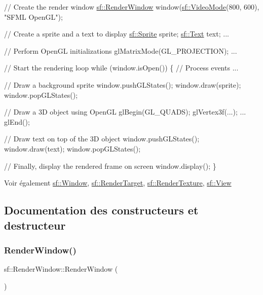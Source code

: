 \begin{DoxyCode}
\textcolor{comment}{// Create the render window}
\hyperlink{classsf_1_1RenderWindow}{sf::RenderWindow} window(\hyperlink{classsf_1_1VideoMode}{sf::VideoMode}(800, 600), \textcolor{stringliteral}{"SFML OpenGL"});

\textcolor{comment}{// Create a sprite and a text to display}
\hyperlink{classsf_1_1Sprite}{sf::Sprite} sprite;
\hyperlink{classsf_1_1Text}{sf::Text} text;
...

\textcolor{comment}{// Perform OpenGL initializations}
glMatrixMode(GL\_PROJECTION);
...

\textcolor{comment}{// Start the rendering loop}
while (window.isOpen())
\{
    \textcolor{comment}{// Process events}
    ...

    \textcolor{comment}{// Draw a background sprite}
    window.pushGLStates();
    window.draw(sprite);
    window.popGLStates();

    \textcolor{comment}{// Draw a 3D object using OpenGL}
    glBegin(GL\_QUADS);
        glVertex3f(...);
        ...
    glEnd();

    \textcolor{comment}{// Draw text on top of the 3D object}
    window.pushGLStates();
    window.draw(text);
    window.popGLStates();

    \textcolor{comment}{// Finally, display the rendered frame on screen}
    window.display();
\}
\end{DoxyCode}


\begin{DoxySeeAlso}{Voir également}
\hyperlink{classsf_1_1Window}{sf\+::\+Window}, \hyperlink{classsf_1_1RenderTarget}{sf\+::\+Render\+Target}, \hyperlink{classsf_1_1RenderTexture}{sf\+::\+Render\+Texture}, \hyperlink{classsf_1_1View}{sf\+::\+View} 
\end{DoxySeeAlso}


\subsection{Documentation des constructeurs et destructeur}
\mbox{\label{classsf_1_1RenderWindow_a839bbf336bdcafb084dafc3076fc9021}} 
\subsubsection{\texorpdfstring{Render\+Window()}{RenderWindow()}\hspace{0.1cm}{\footnotesize\ttfamily [1/3]}}
{\footnotesize\ttfamily sf\+::\+Render\+Window\+::\+Render\+Window (\begin{DoxyParamCaption}{ }\end{DoxyParamCaption})}



